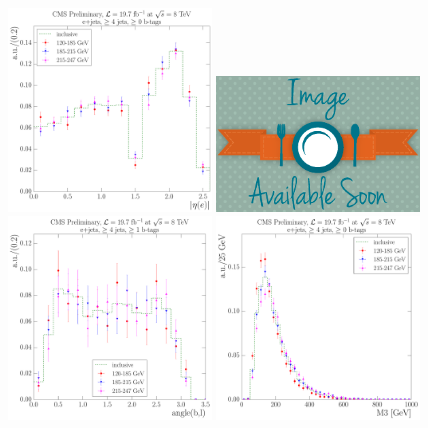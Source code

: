 \begin{figure}[hbtp]
    \centering
     \includegraphics[width=0.48\textwidth]{Chapters/04_Analysis/04b_XSections/images/8TeV/fit_variables/HT/electron_absolute_eta/qcd/HT_electron_absolute_eta_0orMoreBtag_QCD_template_comparison.pdf}\hfill
     \includegraphics[width=0.48\textwidth]{Chapters/04_Analysis/04b_XSections/images/placeholder.png}\hfill
     \includegraphics[width=0.48\textwidth]{Chapters/04_Analysis/04b_XSections/images/8TeV/fit_variables/HT/angle_bl/qcd/HT_angle_bl_1orMoreBtag_QCD_template_comparison.pdf}\hfill
     \includegraphics[width=0.48\textwidth]{Chapters/04_Analysis/04b_XSections/images/8TeV/fit_variables/HT/M3/qcd/HT_M3_0orMoreBtag_QCD_template_comparison.pdf}\\

\end{figure}

